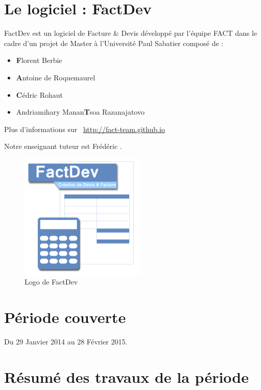 \documentclass[12pt,a4paper,openany]{article}
\begin{document}
	\thispagestyle{empty} %
	\titleBC 
	\newpage
	\setcounter{tocdepth}{1}
	\setcounter{secnumdepth}{3}
	
	\tableofcontents
	\newpage
	\section{Le logiciel : FactDev}
	FactDev est un logiciel de Facture \& Devis développé par l'équipe FACT dans le cadre d'un projet de Master à l'Université Paul Sabatier composé de : 
	\begin{itemize}
		\item \textbf{F}lorent Berbie
		\item \textbf{A}ntoine de Roquemaurel
		\item \textbf{C}édric Rohaut
		\item Andriamihary Manan\textbf{T}soa Razanajatovo
	\end{itemize}

	Plus d’informations sur \Mundus~\url{http://fact-team.github.io}

	Notre enseignant tuteur est Frédéric .

	\begin{figure}[H]
		\centering
		\includegraphics[width=6cm]{../FACTDev.png}
		\caption{Logo de FactDev}
	\end{figure}

 	\section{Période couverte}
	Du 29 Janvier 2014 au 28 Février 2015.

	\section{Résumé des travaux de la période}
\end{document}
